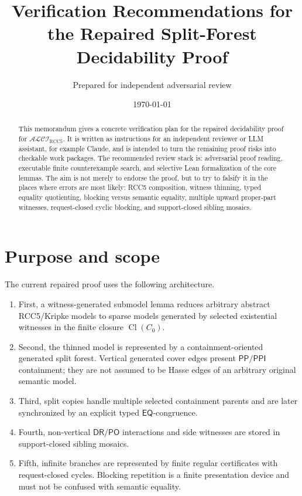 \documentclass[11pt]{article}
\title{Verification Recommendations for the Repaired Split-Forest Decidability Proof}
\author{Prepared for independent adversarial review}
\date{\today}
\newcommand{\ALCIRCC}{\ensuremath{\mathcal{ALCI}_{\mathrm{RCC5}}}}
\newcommand{\Cl}{\operatorname{Cl}}
\newcommand{\EQ}{\mathsf{EQ}}
\newcommand{\PP}{\mathsf{PP}}
\newcommand{\PPI}{\mathsf{PPI}}
\newcommand{\PO}{\mathsf{PO}}
\newcommand{\DR}{\mathsf{DR}}
\theoremstyle{definition}
\theoremstyle{plain}
\begin{document}
\maketitle

\begin{abstract}
This memorandum gives a concrete verification plan for the repaired decidability proof for \ALCIRCC.  It is written as instructions for an independent reviewer or LLM assistant, for example Claude, and is intended to turn the remaining proof risks into checkable work packages.  The recommended review stack is: adversarial proof reading, executable finite counterexample search, and selective Lean formalization of the core lemmas.  The aim is not merely to endorse the proof, but to try to falsify it in the places where errors are most likely: RCC5 composition, witness thinning, typed equality quotienting, blocking versus semantic equality, multiple upward proper-part witnesses, request-closed cyclic blocking, and support-closed sibling mosaics.
\end{abstract}

\section{Purpose and scope}

The current repaired proof uses the following architecture.
\begin{enumerate}[label=(\arabic*)]
  \item First, a witness-generated submodel lemma reduces arbitrary abstract RCC5/Kripke models to sparse models generated by selected existential witnesses in the finite closure \(\Cl(C_0)\).
  \item Second, the thinned model is represented by a containment-oriented generated split forest.  Vertical generated cover edges present \(\PP/\PPI\) containment; they are not assumed to be Hasse edges of an arbitrary original semantic model.
  \item Third, split copies handle multiple selected containment parents and are later synchronized by an explicit typed \(\EQ\)-congruence.
  \item Fourth, non-vertical \(\DR/\PO\) interactions and side witnesses are stored in support-closed sibling mosaics.
  \item Fifth, infinite branches are represented by finite regular certificates with request-closed cycles.  Blocking repetition is a finite presentation device and must not be confused with semantic equality.
\end{enumerate}
\end{document}
